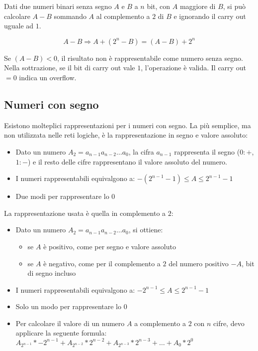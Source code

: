 \documentclass{subfiles}
\begin{document}
Dati due numeri binari senza segno $A$ e $B$ a $n$ bit, con $A$ maggiore di $B$, si può calcolare $A - B$ sommando $A$ al complemento a $2$ di $B$ e ignorando il carry out uguale ad $1$.

$$
A - B \Rightarrow A + (2^n - B) = (A - B) + 2^n
$$

\noindent
Se $(A - B) < 0$, il risultato non è rappresentabile come numero senza segno.
Nella sottrazione, se il bit di carry out vale $1$, l'operazione è valida. Il carry out $=0$ indica un overflow.

\subsection{Numeri con segno}

Esistono molteplici rappresentazioni per i numeri con segno.
La più semplice, ma non utilizzata nelle reti logiche, è la rappresentazione in segno e valore assoluto:

\begin{itemize}
    \item Dato un numero $A_{2} = a_{n-1} a_{n-2} \dots a_0$, la cifra $a_{n-1}$ rappresenta il segno ($0:+$,$1:-$) e il resto delle cifre rappresentano il valore assoluto del numero.
    \item I numeri rappresentabili equivalgono a: $-(2^{n-1} - 1) \leq A \leq 2^{n-1} - 1$
    \item Due modi per rappresentare lo $0$
\end{itemize}

\noindent
La rappresentazione usata è quella in complemento a $2$:

\begin{itemize}
    \item Dato un numero $A_{2} = a_{n-1} a_{n-2} \dots a_0$, si ottiene:

    \begin{itemize}
        \item se $A$ è positivo, come per segno e valore assoluto
        \item se $A$ è negativo, come per il complemento a $2$ del numero positivo $-A$, bit di segno incluso
    \end{itemize}

    \item I numeri rappresentabili equivalgono a: $-2^{n-1} \leq A \leq 2^{n-1} - 1$
    \item Solo un modo per rappresentare lo $0$
    \item Per calcolare il valore di un numero $A$ a complemento a $2$ con $n$ cifre, devo applicare la seguente formula: $A_{2^{n-1}} * -2^{n-1} + A_{2^{n-2}} * 2^{n-2} + A_{2^{n-3}} * 2^{n-3} + \dots + A_0 * 2^0$
\end{itemize}
\end{document}
